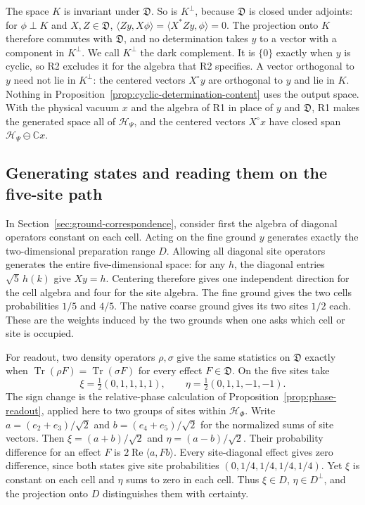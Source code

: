\documentclass[11pt]{article}
\theoremstyle{definition}
\DeclareMathOperator{\Tr}{Tr}
\newcommand{\C}{\mathbb C}
\begin{document}
The space $K$ is invariant under $\mathfrak D$. So is $K^\perp$, because $\mathfrak D$ is closed under adjoints: for $\phi\perp K$ and $X,Z\in\mathfrak D$, $\langle Zy,X\phi\rangle=\langle X^*Zy,\phi\rangle=0$. The projection onto $K$ therefore commutes with $\mathfrak D$, and no determination takes $y$ to a vector with a component in $K^\perp$. We call $K^\perp$ the dark complement. It is $\{0\}$ exactly when $y$ is cyclic, so R2 excludes it for the algebra that R2 specifies. A vector orthogonal to $y$ need not lie in $K^\perp$: the centered vectors $X^\circ y$ are orthogonal to $y$ and lie in $K$. Nothing in Proposition~\ref{prop:cyclic-determination-content} uses the output space. With the physical vacuum $x$ and the algebra of R1 in place of $y$ and $\mathfrak D$, R1 makes the generated space all of $\mathcal H_\Psi$, and the centered vectors $X^\circ x$ have closed span $\mathcal H_\Psi\ominus\C x$.

\subsection{Generating states and reading them on the five-site path}
In Section~\ref{sec:ground-correspondence}, consider first the algebra of diagonal operators constant on each cell. Acting on the fine ground $y$ generates exactly the two-dimensional preparation range $D$. Allowing all diagonal site operators generates the entire five-dimensional space: for any $h$, the diagonal entries $\sqrt5\,h(k)$ give $Xy=h$. Centering therefore gives one independent direction for the cell algebra and four for the site algebra. The fine ground gives the two cells probabilities $1/5$ and $4/5$. The native coarse ground gives its two sites $1/2$ each. These are the weights induced by the two grounds when one asks which cell or site is occupied.

For readout, two density operators $\rho,\sigma$ give the same statistics on $\mathfrak D$ exactly when $\Tr(\rho F)=\Tr(\sigma F)$ for every effect $F\in\mathfrak D$. On the five sites take
\begin{equation}
 \xi=\tfrac12(0,1,1,1,1),\qquad
 \eta=\tfrac12(0,1,1,-1,-1).
 \label{eq:path-readout-states}
\end{equation}
The sign change is the relative-phase calculation of Proposition~\ref{prop:phase-readout}, applied here to two groups of sites within $\mathcal H_\Phi$. Write $a=(e_2+e_3)/\sqrt2$ and $b=(e_4+e_5)/\sqrt2$ for the normalized sums of site vectors. Then $\xi=(a+b)/\sqrt2$ and $\eta=(a-b)/\sqrt2$. Their probability difference for an effect $F$ is $2\operatorname{Re}\langle a,Fb\rangle$. Every site-diagonal effect gives zero difference, since both states give site probabilities $(0,1/4,1/4,1/4,1/4)$. Yet $\xi$ is constant on each cell and $\eta$ sums to zero in each cell. Thus $\xi\in D$, $\eta\in D^\perp$, and the projection onto $D$ distinguishes them with certainty.
\end{document}
